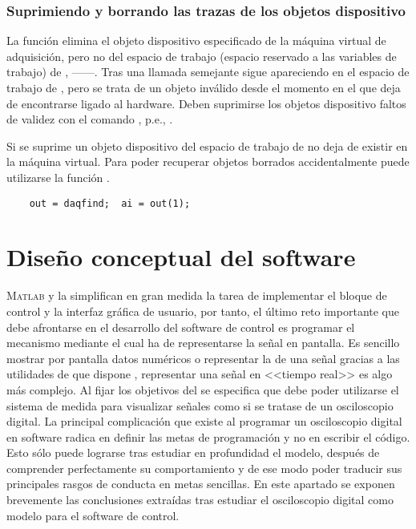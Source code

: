 \subsubsection{Suprimiendo y borrando las trazas de los objetos dispositivo}

La función  elimina el objeto dispositivo especificado de la
máquina virtual de adquisición, pero no del espacio de trabajo (espacio
reservado a las variables de trabajo) de \matlab{},
------. Tras una llamada semejante  sigue
apareciendo en el espacio de trabajo de \matlab{}, pero se trata de un
objeto inválido desde el momento en el que deja de encontrarse ligado al
hardware. Deben suprimirse los objetos dispositivo faltos de validez con el
comando , p.e., .

Si se suprime un objeto dispositivo del espacio de trabajo de \matlab{} no
deja de existir en la máquina virtual. Para poder recuperar objetos
borrados accidentalmente puede utilizarse la función .

\begin{lstlisting}
	out = daqfind;	ai = out(1);
\end{lstlisting}


\section{Diseño conceptual del software}\label{sec:softdesign}

\textsc{Matlab} y la \datx{} simplifican en gran medida la tarea de
implementar el bloque de control y la interfaz gráfica de usuario, por
tanto, el último reto importante que debe afrontarse en el desarrollo del
software de control es programar el mecanismo mediante el cual ha de
representarse la señal en pantalla. Es sencillo mostrar por pantalla datos
numéricos o representar la  de una señal gracias a las utilidades
de que dispone \matlab{}, representar una señal en <<tiempo real>> es algo
más complejo. Al fijar los objetivos del  se especifica que debe
poder utilizarse el sistema de medida para visualizar señales como si se
tratase de un osciloscopio digital. La principal complicación que existe al
programar un osciloscopio digital en software radica en definir las metas
de programación y no en escribir el código. Esto sólo puede lograrse tras
estudiar en profundidad el modelo, después de comprender perfectamente su
comportamiento y de ese modo poder traducir sus principales rasgos de
conducta en metas sencillas. En este apartado se exponen brevemente las
conclusiones extraídas tras estudiar el osciloscopio digital como modelo
para el software de control.


